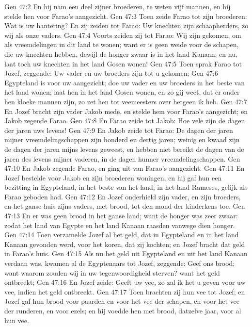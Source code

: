 Gen 47:2  En hij nam een deel zijner broederen, te weten vijf mannen, en hij stelde hen voor Farao's aangezicht.
Gen 47:3  Toen zeide Farao tot zijn broederen: Wat is uw hantering? En zij zeiden tot Farao: Uw knechten zijn schaapherders, zo wij als onze vaders.
Gen 47:4  Voorts zeiden zij tot Farao: Wij zijn gekomen, om als vreemdelingen in dit land te wonen; want er is geen weide voor de schapen, die uw knechten hebben, dewijl de honger zwaar is in het land Kanaan; en nu, laat toch uw knechten in het land Gosen wonen!
Gen 47:5  Toen sprak Farao tot Jozef, zeggende: Uw vader en uw broeders zijn tot u gekomen;
Gen 47:6  Egypteland is voor uw aangezicht; doe uw vader en uw broeders in het beste van het land wonen; laat hen in het land Gosen wonen, en zo gij weet, dat er onder hen kloeke mannen zijn, zo zet hen tot veemeesters over hetgeen ik heb.
Gen 47:7  En Jozef bracht zijn vader Jakob mede, en stelde hem voor Farao's aangezicht; en Jakob zegende Farao.
Gen 47:8  En Farao zeide tot Jakob: Hoe vele zijn de dagen der jaren uws levens!
Gen 47:9  En Jakob zeide tot Farao: De dagen der jaren mijner vreemdelingschappen zijn honderd en dertig jaren; weinig en kwaad zijn de dagen der jaren mijns levens geweest, en hebben niet bereikt de dagen van de jaren des levens mijner vaderen, in de dagen hunner vreemdelingschappen.
Gen 47:10  En Jakob zegende Farao, en ging uit van Farao's aangezicht.
Gen 47:11  En Jozef bestelde voor Jakob en zijn broederen woningen, en hij gaf hun een bezitting in Egypteland, in het beste van het land, in het land Rameses, gelijk als Farao geboden had.
Gen 47:12  En Jozef onderhield zijn vader, en zijn broeders, en het ganse huis zijns vaders, met brood, tot den mond der kinderkens toe.
Gen 47:13  En er was geen brood in het ganse land; want de honger was zeer zwaar: zodat het land van Egypte en het land Kanaan raasden vanwege dien honger.
Gen 47:14  Toen verzamelde Jozef al het geld, dat in Egypteland en in het land Kanaan gevonden werd, voor het koren, dat zij kochten; en Jozef bracht dat geld in Farao's huis.
Gen 47:15  Als nu het geld uit Egypteland en uit het land Kanaan verdaan was, kwamen al de Egyptenaars tot Jozef, zeggende: Geef ons brood; want waarom zouden wij in uw tegenwoordigheid sterven? want het geld ontbreekt;
Gen 47:16  En Jozef zeide: Geeft uw vee, zo zal ik het u geven voor uw vee, indien het geld ontbreekt.
Gen 47:17  Toen brachten zij hun vee tot Jozef; en Jozef gaf hun brood voor paarden en voor het vee der schapen, en voor het vee der runderen, en voor ezels; en hij voedde hen met brood, datzelve jaar, voor al hun vee.
